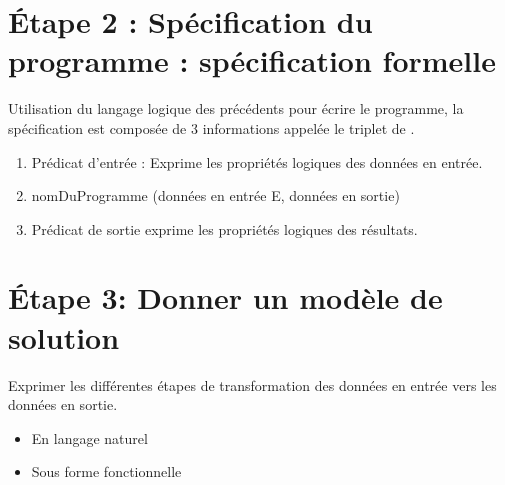 	\section{\'Etape 2 : Spécification du programme : spécification formelle}
	Utilisation du langage logique des précédents pour écrire le programme, la spécification est composée de 3 informations appelée le triplet de .
		\begin{enumerate}
			\item Prédicat d'entrée : Exprime les propriétés logiques des données en entrée. 
			\item nomDuProgramme (données en entrée E, données en sortie) 
			\item Prédicat de sortie exprime les propriétés logiques des résultats.
		\end{enumerate}
		\section{\'Etape 3: Donner un modèle de solution}
		Exprimer les différentes étapes de transformation des données en entrée vers les données en sortie. 
		\begin{itemize}
			\item En langage naturel
			\item Sous forme fonctionnelle
		\end{itemize}
